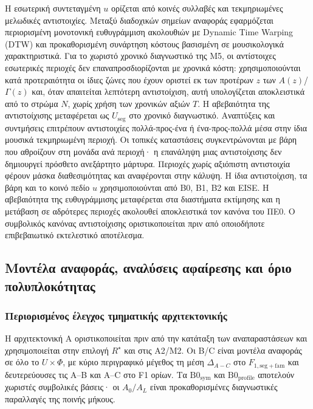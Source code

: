 \documentclass[11pt,a4paper]{article}
\begin{document}
Η εσωτερική συντεταγμένη $u$ ορίζεται από κοινές συλλαβές και τεκμηριωμένες μελωδικές αντιστοιχίες. Μεταξύ διαδοχικών σημείων αναφοράς εφαρμόζεται περιορισμένη μονοτονική ευθυγράμμιση ακολουθιών με Dynamic Time Warping (DTW) και προκαθορισμένη συνάρτηση κόστους βασισμένη σε μουσικολογικά χαρακτηριστικά. Για το χωριστό χρονικό διαγνωστικό της M5, οι αντίστοιχες εσωτερικές περιοχές δεν επαναπροσδιορίζονται με χρονικά κόστη: χρησιμοποιούνται κατά προτεραιότητα οι ίδιες ζώνες που έχουν οριστεί εκ των προτέρων $z$ των $A(z)$/$\Gamma(z)$ και, όταν απαιτείται λεπτότερη αντιστοίχιση, αυτή υπολογίζεται αποκλειστικά από το στρώμα $N$, χωρίς χρήση των χρονικών αξιών $T$. Η αβεβαιότητα της αντιστοίχισης μεταφέρεται ως $U_{\mathrm{seg}}$ στο χρονικό διαγνωστικό. Αναπτύξεις και συντμήσεις επιτρέπουν αντιστοιχίες πολλά-προς-ένα ή ένα-προς-πολλά μέσα στην ίδια μουσικά τεκμηριωμένη περιοχή. Οι τοπικές καταστάσεις συγκεντρώνονται με βάρη που αθροίζουν στη μονάδα ανά περιοχή· η επανάληψη μιας αντιστοίχισης δεν δημιουργεί πρόσθετο ανεξάρτητο μάρτυρα. Περιοχές χωρίς αξιόπιστη αντιστοιχία φέρουν μάσκα διαθεσιμότητας και αναφέρονται στην κάλυψη. Η ίδια αντιστοίχιση, τα βάρη και το κοινό πεδίο $u$ χρησιμοποιούνται από B0, B1, B2 και EISE. Η αβεβαιότητα της ευθυγράμμισης μεταφέρεται στα διαστήματα εκτίμησης και η μετάβαση σε αδρότερες περιοχές ακολουθεί αποκλειστικά τον κανόνα του ΠΕ0. Ο συμβολικός κανόνας αντιστοίχισης οριστικοποιείται πριν από οποιοδήποτε επιβεβαιωτικό εκτελεστικό αποτέλεσμα.

\subsection{Μοντέλα αναφοράς, αναλύσεις αφαίρεσης και όριο πολυπλοκότητας}\label{app:eise-baselines}

\subsubsection{Περιορισμένος έλεγχος τμηματικής αρχιτεκτονικής}\label{app:eise-model-selection}
Η αρχιτεκτονική A οριστικοποιείται πριν από την κατάταξη των αναπαραστάσεων και χρησιμοποιείται στην επιλογή $R^\star$ και στις Α2/Μ2. Οι B/C είναι μοντέλα αναφοράς σε όλο το $U\times\Phi$, με κύριο περιγραφικό μέγεθος τη μέση $\Delta_{A-C}$ στο $F_{1,\mathrm{seg+fam}}$ και δευτερεύουσες τις A--B και A--C στο F1 ορίων. Τα $\mathrm{B0}_{\mathrm{sym}}$ και $\mathrm{B0}_{\mathrm{profile}}$ αποτελούν χωριστές συμβολικές βάσεις· οι $A_0/A_L$ είναι προκαθορισμένες διαγνωστικές παραλλαγές της ποινής μήκους.
\end{document}

